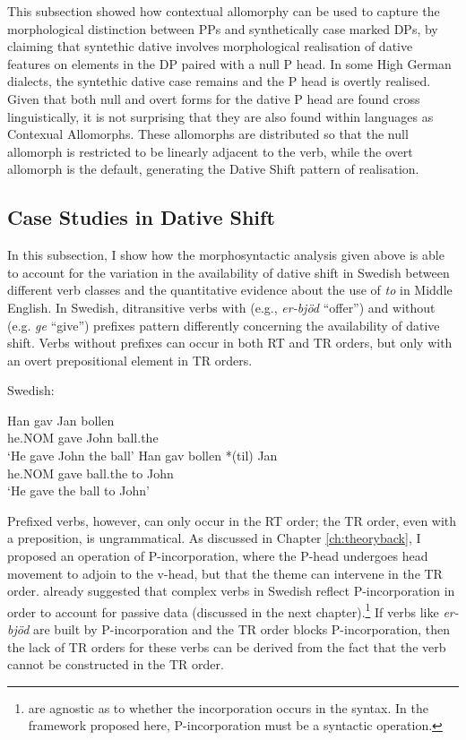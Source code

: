 	This subsection showed how contextual allomorphy can be used to capture the morphological distinction between PPs and synthetically case marked DPs, by claiming that syntethic dative involves morphological realisation of dative features on elements in the DP paired with a null P head. In some High German dialects, the syntethic dative case remains and the P head is overtly realised. Given that both null and overt forms for the dative P head are found cross linguistically, it is not surprising that they are also found within languages as Contexual Allomorphs. These allomorphs are distributed so that the null allomorph is restricted to be linearly adjacent to the verb, while the overt allomorph is the default, generating the Dative Shift pattern of realisation.
	\subsection{Case Studies in Dative Shift}
	In this subsection, I show how the morphosyntactic analysis given above is able to account for the variation in the availability of dative shift in Swedish between different verb classes and the quantitative evidence about the use of \textit{to} in Middle English. 
	In Swedish, ditransitive verbs with (e.g., \textit{er-bjöd} ``offer'') and without (e.g. \textit{ge} ``give'') prefixes pattern differently concerning the availability of dative shift. Verbs without prefixes can occur in both RT and TR orders, but only with an overt prepositional element in TR orders.
		\begin{exe}
			\ex Swedish:\label{ex:sw-act-simple}
			\begin{xlist}
				\ex \gll Han gav Jan bollen\\
				he.NOM gave John ball.the\\
				\trans `He gave John the ball'
				\ex \gll Han gav bollen *(til) Jan\\
				he.NOM gave ball.the to John\\
				\trans `He gave the ball to John'
			\end{xlist}
		\end{exe}
		Prefixed verbs, however, can only occur in the RT order; the TR order, even with a preposition, is ungrammatical. As discussed in Chapter \ref{ch:theoryback}, I proposed an operation of P-incorporation, where the P-head undergoes head movement to adjoin to the v-head, but that the theme can intervene in the TR order. \cite{Holmberg.1995} already suggested that complex verbs in Swedish reflect P-incorporation in order to account for passive data (discussed in the next chapter).\footnote{\cite{Holmber.1995} are agnostic as to whether the incorporation occurs in the syntax. In the framework proposed here, P-incorporation must be a syntactic operation.} If verbs like \textit{er-bjöd} are built by P-incorporation and the TR order blocks P-incorporation, then the lack of TR orders for these verbs can be derived from the fact that the verb cannot be constructed in the TR order.
